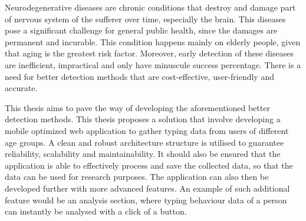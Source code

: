 






Neurodegenerative diseases are chronic conditions that destroy and damage part of nervous system of the sufferer over time, especially the brain. 
This diseases pose a significant challenge for general public health, since the damages are permanent and incurable. 
This condition happens mainly on elderly people, given that aging is the greatest risk factor. 
Moreover, early detection of these diseases are inefficient, impractical and only have minuscule success percentage. 
There is a need for better detection methods that are cost-effective, user-friendly and accurate.

This thesis aims to pave the way of developing the aforementioned better detection methods.
This thesis proposes a solution that involve developing a mobile optimized web application to gather typing data from users of different age groups. 
A clean and robust architecture structure is utilised to guarantee reliability, scalability and maintainability. 
It should also be ensured that the application is able to effectively process and save the collected data, so that the data can be used for research purposes.
The application can also then be developed further with more advanced features. 
An example of such additional feature would be an analysis section, where typing behaviour data of a person can instantly be analysed with a click of a button.


